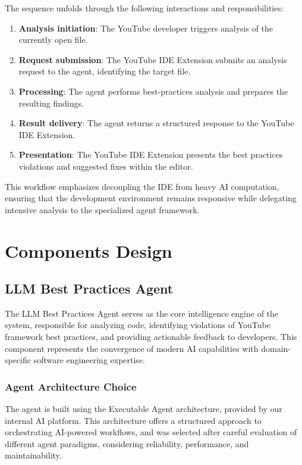\begin{spacing}{1.2}
The sequence unfolds through the following interactions and responsibilities:
\begin{enumerate}
    \item \textbf{Analysis initiation}: The YouTube developer triggers analysis of the currently open file.
    \item \textbf{Request submission}: The YouTube IDE Extension submits an analysis request to the agent, identifying the target file.
    \item \textbf{Processing}: The agent performs best-practices analysis and prepares the resulting findings.
    \item \textbf{Result delivery}: The agent returns a structured response to the YouTube IDE Extension.
    \item \textbf{Presentation}: The YouTube IDE Extension presents the best practices violations and suggested fixes within the editor.
\end{enumerate}

This workflow emphasizes decoupling the IDE from heavy AI computation, ensuring that the development environment remains responsive while delegating intensive analysis to the specialized agent framework.

\section{Components Design}

\subsection{LLM Best Practices Agent} 
The LLM Best Practices Agent serves as the core intelligence engine of the system, responsible for analyzing code, identifying violations of YouTube framework best practices, and providing actionable feedback to developers. This component represents the convergence of modern AI capabilities with domain-specific software engineering expertise.

\subsubsection{Agent Architecture Choice}
The agent is built using the Executable Agent architecture, provided by our internal AI platform. This architecture offers a structured approach to orchestrating AI-powered workflows, and was selected after careful evaluation of different agent paradigms, considering reliability, performance, and maintainability.


\end{spacing}
